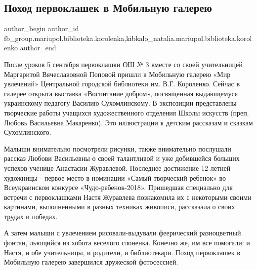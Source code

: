  
 
 
 
 

\subsection{Поход первоклашек в  Мобильную галерею}
\label{sec:05_09_2018.fb.fb_group.mariupol.biblioteka.korolenka.1._pokhod_pervoklashek}
 
\ifcmt
 author_begin
   author_id fb_group.mariupol.biblioteka.korolenka,kibkalo_natalia.mariupol.biblioteka.korolenko
 author_end
\fi

После уроков 5 сентября первоклашки ОШ № 3 вместе со своей учительницей
Маргаритой Вячеславовной Поповой пришли в Мобильную галерею «Мир увлечений»
Центральной городской библиотеки им. В.Г. Короленко. Сейчас в галерее открыта
выставка «Воспитание добром», посвященная выдающемуся украинскому педагогу
Василию Сухомлинскому. В экспозиции представлены творческие работы учащихся
художественного отделения Школы искусств (преп. Любовь Васильевна Макаренко).
Это иллюстрации к  детским рассказам и сказкам Сухомлинского.

Малыши внимательно посмотрели рисунки, также внимательно послушали рассказ
Любови Васильевны о своей талантливой и уже добившейся больших успехов ученице
Анастасии Журавлевой. Последнее достижение 12-летней художницы - первое место в
номинации «Самый творческий ребенок» во Всеукраинском конкурсе
«Чудо-ребенок-2018». Пришедшая специально для встречи с первоклашками Настя
Журавлева познакомила их с некоторыми своими картинами, выполненными в разных
техниках живописи,  рассказала о своих трудах и победах. 

А затем малыши с увлечением  рисовали-выдували феерический  разноцветный
фонтан, льющийся из хобота веселого слоненка. Конечно же, им все помогали: и
Настя, и обе учительницы, и родители, и библиотекари. Поход первоклашек в
Мобильную галерею завершился дружеской фотосессией.
